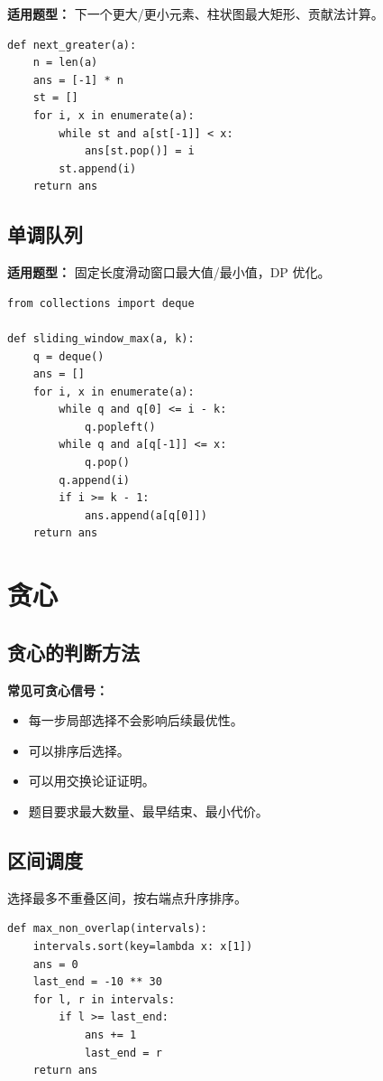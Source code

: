 \documentclass[UTF8,a4paper,14pt]{ctexart}
\begin{document}
\textbf{适用题型：}
下一个更大/更小元素、柱状图最大矩形、贡献法计算。

\begin{lstlisting}
def next_greater(a):
    n = len(a)
    ans = [-1] * n
    st = []
    for i, x in enumerate(a):
        while st and a[st[-1]] < x:
            ans[st.pop()] = i
        st.append(i)
    return ans
\end{lstlisting}

\subsection{单调队列}

\textbf{适用题型：}
固定长度滑动窗口最大值/最小值，DP 优化。

\begin{lstlisting}
from collections import deque

def sliding_window_max(a, k):
    q = deque()
    ans = []
    for i, x in enumerate(a):
        while q and q[0] <= i - k:
            q.popleft()
        while q and a[q[-1]] <= x:
            q.pop()
        q.append(i)
        if i >= k - 1:
            ans.append(a[q[0]])
    return ans
\end{lstlisting}

\section{贪心}

\subsection{贪心的判断方法}

\textbf{常见可贪心信号：}
\begin{itemize}
  \item 每一步局部选择不会影响后续最优性。
  \item 可以排序后选择。
  \item 可以用交换论证证明。
  \item 题目要求最大数量、最早结束、最小代价。
\end{itemize}

\subsection{区间调度}

选择最多不重叠区间，按右端点升序排序。

\begin{lstlisting}
def max_non_overlap(intervals):
    intervals.sort(key=lambda x: x[1])
    ans = 0
    last_end = -10 ** 30
    for l, r in intervals:
        if l >= last_end:
            ans += 1
            last_end = r
    return ans
\end{lstlisting}
\end{document}
